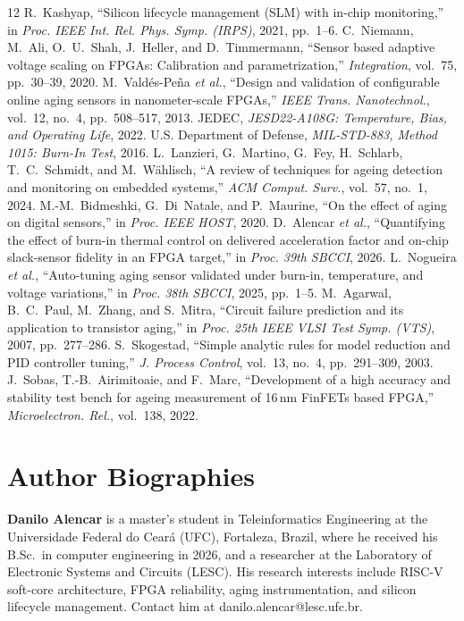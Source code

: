 \documentclass[10pt,twocolumn]{article}
\begin{document}
\renewcommand{\refname}{References}\begin{thebibliography}{12}
\footnotesize
{} R.~Kashyap, ``Silicon lifecycle management (SLM) with in-chip monitoring,'' in \emph{Proc. IEEE Int. Rel. Phys. Symp. (IRPS)}, 2021, pp.~1--6.
 C.~Niemann, M.~Ali, O.~U.~Shah, J.~Heller, and D.~Timmermann, ``Sensor based adaptive voltage scaling on FPGAs: Calibration and parametrization,'' \emph{Integration}, vol.~75, pp.~30--39, 2020.
 M.~Vald\'es-Pe\~na \emph{et al.}, ``Design and validation of configurable online aging sensors in nanometer-scale FPGAs,'' \emph{IEEE Trans. Nanotechnol.}, vol.~12, no.~4, pp.~508--517, 2013.
 JEDEC, \emph{JESD22-A108G: Temperature, Bias, and Operating Life}, 2022.
 U.S. Department of Defense, \emph{MIL-STD-883, Method 1015: Burn-In Test}, 2016.
 L.~Lanzieri, G.~Martino, G.~Fey, H.~Schlarb, T.~C.~Schmidt, and M.~W\"ahlisch, ``A review of techniques for ageing detection and monitoring on embedded systems,'' \emph{ACM Comput. Surv.}, vol.~57, no.~1, 2024.
 M.-M.~Bidmeshki, G.~Di~Natale, and P.~Maurine, ``On the effect of aging on digital sensors,'' in \emph{Proc. IEEE HOST}, 2020.
 D.~Alencar \emph{et al.}, ``Quantifying the effect of burn-in thermal control on delivered acceleration factor and on-chip slack-sensor fidelity in an FPGA target,'' in \emph{Proc. 39th SBCCI}, 2026.
 L.~Nogueira \emph{et al.}, ``Auto-tuning aging sensor validated under burn-in, temperature, and voltage variations,'' in \emph{Proc. 38th SBCCI}, 2025, pp.~1--5.
 M.~Agarwal, B.~C.~Paul, M.~Zhang, and S.~Mitra, ``Circuit failure prediction and its application to transistor aging,'' in \emph{Proc. 25th IEEE VLSI Test Symp. (VTS)}, 2007, pp.~277--286.
 S.~Skogestad, ``Simple analytic rules for model reduction and PID controller tuning,'' \emph{J. Process Control}, vol.~13, no.~4, pp.~291--309, 2003.
 J.~Sobas, T.-B.~Airimitoaie, and F.~Marc, ``Development of a high accuracy and stability test bench for ageing measurement of 16\,nm FinFETs based FPGA,'' \emph{Microelectron. Rel.}, vol.~138, 2022.
\end{thebibliography}

\section*{Author Biographies}
\footnotesize
\noindent\textbf{Danilo Alencar} is a master's student in Teleinformatics Engineering at the Universidade Federal do Cear\'a (UFC), Fortaleza, Brazil, where he received his B.Sc.\ in computer engineering in 2026, and a researcher at the Laboratory of Electronic Systems and Circuits (LESC). His research interests include RISC-V soft-core architecture, FPGA reliability, aging instrumentation, and silicon lifecycle management. Contact him at danilo.alencar@lesc.ufc.br.
\end{document}

